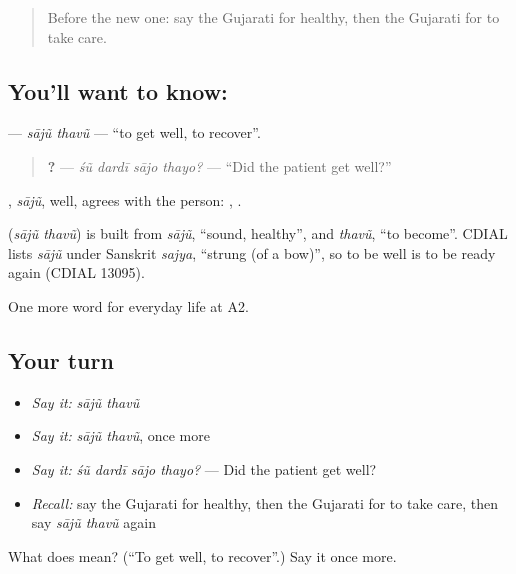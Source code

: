 \label{lesson:GU-C232-saju-thavu}



\begin{quote}
Before the new one: say the Gujarati for healthy, then the Gujarati for to take care.
\end{quote}

\subsection*{You'll want to know:  }
\textbf{ } — \emph{sājũ thavũ} — \textquotedblleft{}to get well, to recover\textquotedblright{}.

\begin{quote}
\textbf{   ?} — \emph{śũ dardī sājo thayo?} — \textquotedblleft{}Did the patient get well?\textquotedblright{}
\end{quote}

\textbf{}, \emph{sājũ}, well, agrees with the person: \textbf{}, \textbf{}.

\begin{cousinweb}
\textbf{ } (\emph{sājũ thavũ}) is built from \emph{sājũ}, \textquotedblleft{}sound, healthy\textquotedblright{}, and \emph{thavũ}, \textquotedblleft{}to become\textquotedblright{}. CDIAL lists \emph{sājũ} under Sanskrit \emph{sajya}, \textquotedblleft{}strung (of a bow)\textquotedblright{}, so to be well is to be ready again (CDIAL 13095).
\end{cousinweb}

\begin{grammarlens}[title={What you've built}]
One more word for everyday life at A2.
\end{grammarlens}

\subsection*{Your turn}
\begin{itemize}
\raggedright
  \item \emph{Say it:} \emph{sājũ thavũ}
  \item \emph{Say it:} \emph{sājũ thavũ}, once more
  \item \emph{Say it:} \emph{śũ dardī sājo thayo?} — Did the patient get well?
  \item \emph{Recall:} say the Gujarati for healthy, then the Gujarati for to take care, then say \emph{sājũ thavũ} again
\end{itemize}

\begin{tcolorbox}[breakable,colback=teal!4,colframe=teal!35!black,title={Before you move on}]
What does   mean? (\textquotedblleft{}To get well, to recover\textquotedblright{}.) Say it once more.
\end{tcolorbox}
